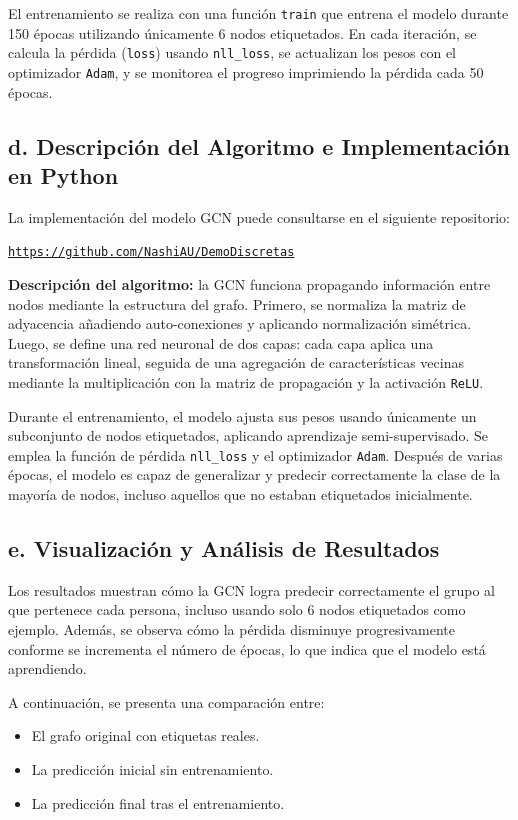 \documentclass[11pt]{article} %
\begin{document}
El entrenamiento se realiza con una función \texttt{train} que entrena el modelo durante 150 épocas utilizando únicamente 6 nodos etiquetados. En cada iteración, se calcula la pérdida (\texttt{loss}) usando \texttt{nll\_loss}, se actualizan los pesos con el optimizador \texttt{Adam}, y se monitorea el progreso imprimiendo la pérdida cada 50 épocas.

\subsection*{d. Descripción del Algoritmo e Implementación en Python}
La implementación del modelo GCN puede consultarse en el siguiente repositorio: 

\begin{center}
\texttt{\url{https://github.com/NashiAU/DemoDiscretas}}
\end{center}

\textbf{Descripción del algoritmo:} la GCN funciona propagando información entre nodos mediante la estructura del grafo. Primero, se normaliza la matriz de adyacencia añadiendo auto-conexiones y aplicando normalización simétrica. Luego, se define una red neuronal de dos capas: cada capa aplica una transformación lineal, seguida de una agregación de características vecinas mediante la multiplicación con la matriz de propagación y la activación \texttt{ReLU}. 

Durante el entrenamiento, el modelo ajusta sus pesos usando únicamente un subconjunto de nodos etiquetados, aplicando aprendizaje semi-supervisado. Se emplea la función de pérdida \texttt{nll\_loss} y el optimizador \texttt{Adam}. Después de varias épocas, el modelo es capaz de generalizar y predecir correctamente la clase de la mayoría de nodos, incluso aquellos que no estaban etiquetados inicialmente.

\subsection*{e. Visualización y Análisis de Resultados}
Los resultados muestran cómo la GCN logra predecir correctamente el grupo al que pertenece cada persona, incluso usando solo 6 nodos etiquetados como ejemplo. Además, se observa cómo la pérdida disminuye progresivamente conforme se incrementa el número de épocas, lo que indica que el modelo está aprendiendo.

A continuación, se presenta una comparación entre:
\begin{itemize}
  \item El grafo original con etiquetas reales.
  \item La predicción inicial sin entrenamiento.
  \item La predicción final tras el entrenamiento.
\end{itemize}
\end{document}
